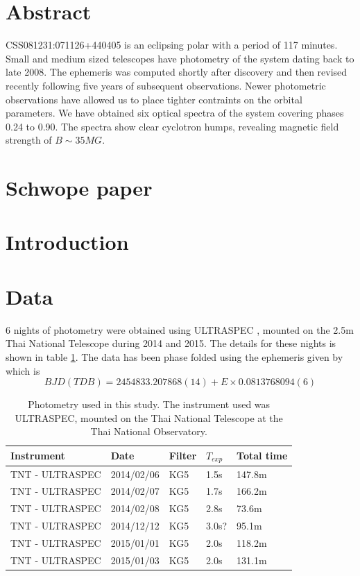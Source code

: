 \documentclass[11pt,a4paper]{report}      %
\begin{document}
\section{Abstract}
CSS081231:071126+440405 is an eclipsing polar with a period of 117 minutes. Small and medium sized telescopes have photometry of the system dating back to late 2008. The ephemeris was computed shortly after discovery and then revised recently following five years of subsequent observations. Newer photometric observations have allowed us to place tighter contraints on the orbital parameters. We have obtained six optical spectra of the system covering phases 0.24 to 0.90. The spectra show clear cyclotron humps, revealing magnetic field strength of $B  \sim 35 MG$.

\section{Schwope paper}

\section{Introduction}


\section{Data}
6 nights of photometry were obtained using ULTRASPEC \citep{ULTRASPEC}, mounted on the 2.5m Thai National Telescope during 2014 and 2015. The details for these nights is shown in table \ref{tab:photometry}. The data has been phase folded using the ephemeris given by \citet{Schwope2015} which is 
\begin{equation}BJD(TDB) = 2454833.207868(14) + E\times0.0813768094(6)\end{equation}

\begin{table}
  \caption{Photometry used in this study. The instrument used was ULTRASPEC, mounted on the Thai National Telescope at the Thai National Observatory.}
  \begin{tabularx}{\textwidth}{ l  l  l  l  l  }
  \hline
  Instrument & Date & Filter & $T_{exp}$& Total time \\
  \hline
    TNT - ULTRASPEC & 2014/02/06 & KG5 & 1.5s & 147.8m \\
    TNT - ULTRASPEC & 2014/02/07 & KG5 & 1.7s & 166.2m \\
    TNT - ULTRASPEC & 2014/02/08 & KG5 & 2.8s & 73.6m \\
    TNT - ULTRASPEC & 2014/12/12 & KG5 & 3.0s? & 95.1m \\
    TNT - ULTRASPEC & 2015/01/01 & KG5 & 2.0s & 118.2m \\
    TNT - ULTRASPEC & 2015/01/03 & KG5 & 2.0s & 131.1m \\
    
  \hline
  \end{tabularx}
  \label{tab:photometry}
\end{table}
\end{document}
